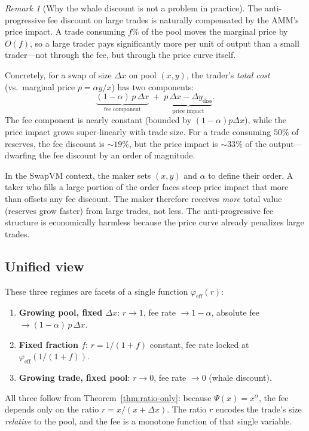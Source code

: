 \documentclass[11pt]{article}
\theoremstyle{definition}
\theoremstyle{remark}
\newtheorem{remark}[theorem]{Remark}
\newcommand{\dx}{\Delta x}
\begin{document}
\begin{remark}[Why the whale discount is not a problem in practice]
The anti-progressive fee discount on large trades is naturally compensated by the AMM's price impact.
A trade consuming $f\%$ of the pool moves the marginal price by $O(f)$, so a large trader pays significantly more per unit of output than a small trader---not through the fee, but through the price curve itself.

Concretely, for a swap of size $\dx$ on pool $(x,y)$, the trader's \emph{total cost} (vs.\ marginal price $p=\alpha y/x$) has two components:
\[
\underbrace{(1-\alpha)\,p\,\dx}_{\text{fee component}} \;+\; \underbrace{p\,\dx - \Delta y_{\mathrm{diss}}}_{\text{price impact}}.
\]
The fee component is nearly constant (bounded by $(1{-}\alpha)p\dx$), while the price impact grows super-linearly with trade size.
For a trade consuming $50\%$ of reserves, the fee discount is ${\sim}19\%$, but the price impact is ${\sim}33\%$ of the output---dwarfing the fee discount by an order of magnitude.

In the SwapVM context, the maker sets $(x,y)$ and $\alpha$ to define their order.
A taker who fills a large portion of the order faces steep price impact that more than offsets any fee discount.
The maker therefore receives \emph{more} total value (reserves grow faster) from large trades, not less.
The anti-progressive fee structure is economically harmless because the price curve already penalizes large trades.
\end{remark}

\subsection{Unified view}

These three regimes are facets of a single function $\varphi_{\mathrm{eff}}(r)$:
\begin{enumerate}
\item \textbf{Growing pool, fixed $\dx$}: $r\to 1$, fee rate $\to 1{-}\alpha$, absolute fee $\to (1{-}\alpha)\,p\,\dx$.
\item \textbf{Fixed fraction $f$}: $r=1/(1{+}f)$ constant, fee rate locked at $\varphi_{\mathrm{eff}}(1/(1{+}f))$.
\item \textbf{Growing trade, fixed pool}: $r\to 0$, fee rate $\to 0$ (whale discount).
\end{enumerate}
All three follow from Theorem~\ref{thm:ratio-only}: because $\Psi(x)=x^\alpha$, the fee depends only on the ratio $r=x/(x{+}\dx)$.
The ratio $r$ encodes the trade's size \emph{relative} to the pool, and the fee is a monotone function of that single variable.
\end{document}
